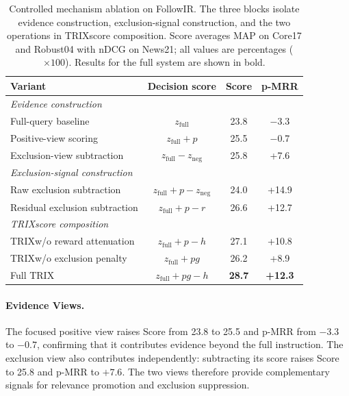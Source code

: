 \documentclass[letterpaper]{article}
\newcommand{\method}{\ifmmode \mathrm{TRIX}\else TRIX\xspace\fi}
\begin{document}
\begin{table}[t]
\centering
\small
\setlength{\tabcolsep}{2pt}
\begin{tabular}{lccc}
\toprule
\textbf{Variant} & \textbf{Decision score} & \textbf{Score} & \textbf{p-MRR} \\
\midrule
\multicolumn{4}{l}{\emph{Evidence construction}} \\
Full-query baseline & $z_{\mathrm{full}}$ & 23.8 & $-$3.3 \\
Positive-view scoring & $z_{\mathrm{full}}+p$ & 25.5 & $-$0.7 \\
Exclusion-view subtraction & $z_{\mathrm{full}}-z_{\mathrm{neg}}$ & 25.8 & +7.6 \\
\midrule
\multicolumn{4}{l}{\emph{Exclusion-signal construction}} \\
Raw exclusion subtraction & $z_{\mathrm{full}}+p-z_{\mathrm{neg}}$ & 24.0 & +14.9 \\
Residual exclusion subtraction & $z_{\mathrm{full}}+p-r$ & 26.6 & +12.7 \\
\midrule
\multicolumn{4}{l}{\emph{\method score composition}} \\
\method w/o reward attenuation & $z_{\mathrm{full}}+p-h$ & 27.1 & +10.8 \\
\method w/o exclusion penalty & $z_{\mathrm{full}}+pg$ & 26.2 & +8.9 \\
Full \method & $z_{\mathrm{full}}+pg-h$ & \textbf{28.7} & \textbf{+12.3} \\
\bottomrule
\end{tabular}
\caption{Controlled mechanism ablation on FollowIR.  The three blocks isolate
evidence construction, exclusion-signal construction, and the two operations
in \method score composition.  Score averages MAP on Core17 and Robust04 with
nDCG on News21; all values are percentages ($\times100$).  Results for the
full system are shown in bold.}
\label{tab:ablation-residual}
\end{table}

\paragraph{Evidence Views.}
The focused positive view raises Score from 23.8 to 25.5 and p-MRR from
$-3.3$ to $-0.7$, confirming that it contributes evidence beyond the full
instruction.  The exclusion view also contributes independently: subtracting
its score raises Score to 25.8 and p-MRR to $+7.6$.  The two views therefore
provide complementary signals for relevance promotion and exclusion
suppression.
\end{document}
